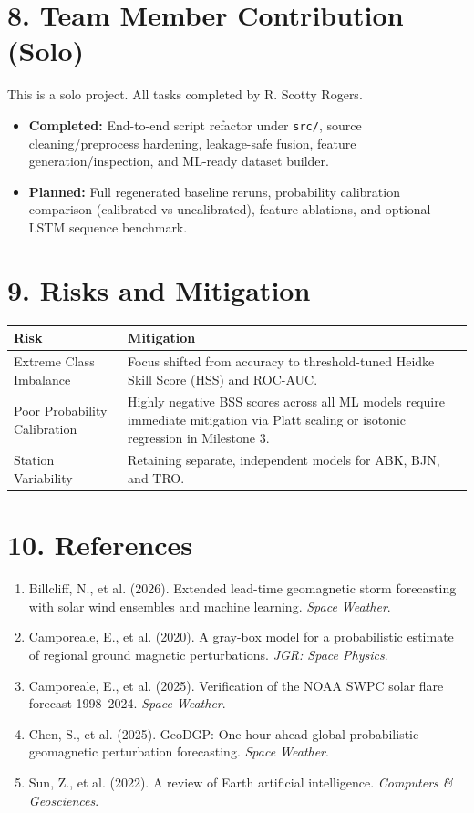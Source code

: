 \documentclass{article}
\begin{document}
\section*{8. Team Member Contribution (Solo)}
This is a solo project. All tasks completed by R. Scotty Rogers.
\begin{itemize}[noitemsep]
    \item \textbf{Completed:} End-to-end script refactor under \texttt{src/}, source cleaning/preprocess hardening, leakage-safe fusion, feature generation/inspection, and ML-ready dataset builder.
    \item \textbf{Planned:} Full regenerated baseline reruns, probability calibration comparison (calibrated vs uncalibrated), feature ablations, and optional LSTM sequence benchmark.
\end{itemize}

\section*{9. Risks and Mitigation}
\begin{table}[H]
\centering
\begin{tabular}{p{4.5cm}p{10cm}}
\toprule
\textbf{Risk} & \textbf{Mitigation} \\
\midrule
Extreme Class Imbalance & Focus shifted from accuracy to threshold-tuned Heidke Skill Score (HSS) and ROC-AUC. \\
Poor Probability Calibration & Highly negative BSS scores across all ML models require immediate mitigation via Platt scaling or isotonic regression in Milestone 3. \\
Station Variability & Retaining separate, independent models for ABK, BJN, and TRO. \\
\bottomrule
\end{tabular}
\end{table}

\section*{10. References}

\begin{enumerate}
    \item Billcliff, N., et al. (2026). Extended lead-time geomagnetic storm forecasting with solar wind ensembles and machine learning. \textit{Space Weather}.
    \item Camporeale, E., et al. (2020). A gray-box model for a probabilistic estimate of regional ground magnetic perturbations. \textit{JGR: Space Physics}.
    \item Camporeale, E., et al. (2025). Verification of the NOAA SWPC solar flare forecast 1998--2024. \textit{Space Weather}.
    \item Chen, S., et al. (2025). GeoDGP: One-hour ahead global probabilistic geomagnetic perturbation forecasting. \textit{Space Weather}.
    \item Sun, Z., et al. (2022). A review of Earth artificial intelligence. \textit{Computers \& Geosciences}.
\end{enumerate}
\end{document}
